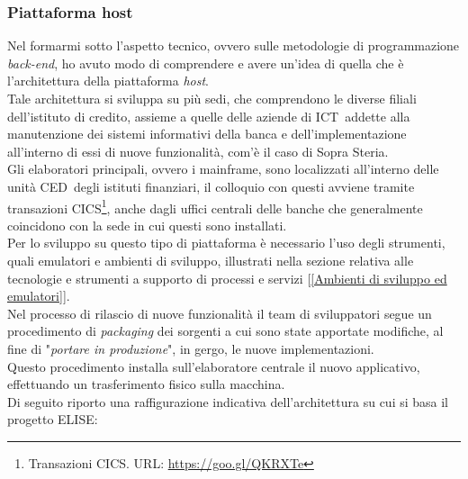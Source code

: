 \subsubsection{Piattaforma host}

Nel formarmi sotto l'aspetto tecnico, ovvero sulle metodologie di programmazione \textit{back-end}\glossario, ho avuto modo di comprendere e avere un'idea di quella che è l'architettura della piattaforma \textit{host}.\\

Tale architettura si sviluppa su più sedi, che comprendono le diverse filiali dell'istituto di credito, assieme a quelle delle aziende di ICT\glossario\ addette alla manutenzione dei sistemi informativi della banca e dell'implementazione all'interno di essi di nuove funzionalità, com'è il caso di Sopra Steria.\\

Gli elaboratori principali, ovvero i mainframe, sono localizzati all'interno delle unità CED\glossario\ degli istituti finanziari, il colloquio con questi avviene tramite transazioni CICS\glossario\footnote{Transazioni CICS. URL: \url{https://goo.gl/QKRXTe}}, anche dagli uffici centrali delle banche che generalmente coincidono con la sede in cui questi sono installati.\\

Per lo sviluppo su questo tipo di piattaforma è necessario l'uso degli strumenti, quali emulatori e ambienti di sviluppo, illustrati nella sezione relativa alle tecnologie e strumenti a supporto di processi e servizi [\ref{Ambienti di sviluppo ed emulatori}].\\

Nel processo di rilascio di nuove funzionalità il team di sviluppatori segue un procedimento di \textit{packaging} dei sorgenti a cui sono state apportate modifiche, al fine di "\textit{portare in produzione}", in gergo, le nuove implementazioni.\\

Questo procedimento installa sull'elaboratore centrale il nuovo applicativo, effettuando un trasferimento fisico sulla macchina.\\

Di seguito riporto una raffigurazione indicativa dell'architettura su cui si basa il progetto ELISE:

